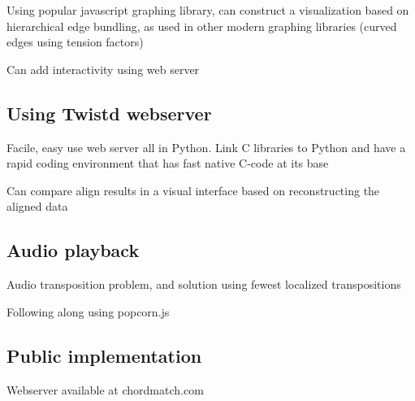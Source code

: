 \item Using popular javascript graphing library, can construct a visualization based on hierarchical edge bundling, as used in other modern graphing libraries (curved edges using tension factors)

\item Can add interactivity using web server

\subsection{Using Twistd webserver}

\item Facile, easy use web server all in Python. Link C libraries to Python and have a rapid coding environment that has fast native C-code at its base

\item Can compare align results in a visual interface based on reconstructing the aligned data

\subsection{Audio playback}

\item Audio transposition problem, and solution using fewest localized transpositions

\item Following along using popcorn.js

\subsection{Public implementation}

\item Webserver available at chordmatch.com